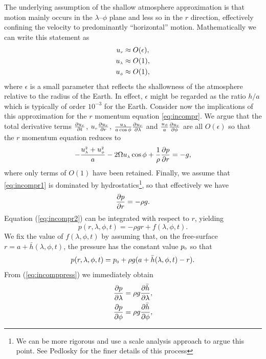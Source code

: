 The underlying assumption of the shallow atmosphere approximation is that motion mainly occurs in the $\lambda$--$\phi$ plane and less so in the $r$ direction, effectively confining the velocity to predominantly ``horizontal'' motion. Mathematically we can write this statement as
\begin{align}
{\ensuremath{u_{\scriptscriptstyle r}}} &\approx O(\epsilon), \label{eq:urapprox}\\
{u_{\scriptscriptstyle \lambda}} &\approx O(1), \\
{u_{\scriptscriptstyle \phi}} &\approx O(1),
\end{align}
where $\epsilon$ is a small parameter that reflects the shallowness of the atmosphere relative to the radius of the Earth. In effect, $\epsilon$ might be regarded as the ratio $h/a$ which is typically of order $10^{-3}$ for the Earth. Consider now the implications of this approximation for the $r$ momentum equation \eqref{eq:incompr}. We argue that the total derivative terms ${\frac{\partial {\ensuremath{u_{\scriptscriptstyle r}}}}{\partial t}}$, ${u_{\scriptscriptstyle r}}{\frac{\partial {\ensuremath{u_{\scriptscriptstyle r}}}}{\partial r}}$, $\frac{{u_{\scriptscriptstyle \lambda}}}{a\cos\phi}{\frac{\partial {\ensuremath{u_{\scriptscriptstyle r}}}}{\partial \lambda}}$ and $\frac{{u_{\scriptscriptstyle \phi}}}{a}{\frac{\partial {\ensuremath{u_{\scriptscriptstyle r}}}}{\partial \phi}}$ are all $O(\epsilon)$ so that the $r$ momentum equation reduces to 
\begin{equation}
-\frac{{u^{\scriptscriptstyle 2}_{\scriptscriptstyle \lambda}}+{u^{\scriptscriptstyle 2}_{\scriptscriptstyle \phi}}}{a}-2\Omega{\ensuremath{u_{\scriptscriptstyle \lambda}}}\cos\phi+\frac{1}{\rho}{\frac{\partial p}{\partial r}}= -g, \label{eq:incompr1}
\end{equation} where only terms of $O(1)$ have been retained. Finally, we assume that \eqref{eq:incompr1} is dominated by hydrostatics\footnote{We can be more rigorous and use a scale analysis approach to argue this point. See Pedlosky\cite[page 60]{Pedlosky:GFD} for the finer details of this process}, so that effectively we have
\begin{equation}
{\ensuremath{\frac{\partial p}{\partial r}}}= -\rho g. \label{eq:incompr2}
\end{equation}
Equation (\ref{eq:incompr2}) can be integrated with respect to $r$, yielding
\begin{equation}
p(r,\lambda,\phi,t)=-\rho g r + f(\lambda,\phi,t).
\end{equation}
We fix the value of $f(\lambda,\phi,t)$ by assuming that, on the free-surface $r=a+\bar{h}(\lambda,\phi,t)$, the pressure has the constant value ${p_{\scriptscriptstyle 0}}$ so that
\begin{equation}
p(r,\lambda,\phi,t)={p_{\scriptscriptstyle 0}}+\rho g (a+\bar{h}(\lambda,\phi,t)-r). \label{eq:incomppress}
\end{equation}
From (\ref{eq:incomppress}) we immediately obtain
\begin{align}
{\ensuremath{\frac{\partial p}{\partial \lambda}}} & = \rho g {\frac{\partial \bar{h}}{\partial \lambda}}, \\
{\frac{\partial p}{\partial \phi}} & = \rho g {\frac{\partial \bar{h}}{\partial \phi}},
\end{align}
